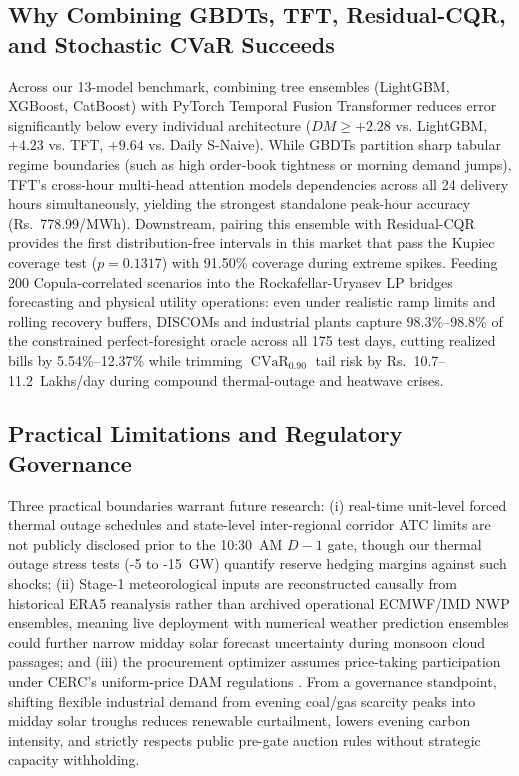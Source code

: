 \documentclass[journal,10pt,twocolumn]{IEEEtran}
\begin{document}
\subsection{Why Combining GBDTs, TFT, Residual-CQR, and Stochastic CVaR Succeeds}
Across our 13-model benchmark, combining tree ensembles (LightGBM, XGBoost, CatBoost) with PyTorch Temporal Fusion Transformer reduces error significantly below every individual architecture ($DM \ge +2.28$ vs. LightGBM, $+4.23$ vs. TFT, $+9.64$ vs. Daily S-Naive). While GBDTs partition sharp tabular regime boundaries (such as high order-book tightness or morning demand jumps), TFT's cross-hour multi-head attention models dependencies across all 24 delivery hours simultaneously, yielding the strongest standalone peak-hour accuracy (Rs.~778.99/MWh). Downstream, pairing this ensemble with Residual-CQR provides the first distribution-free intervals in this market that pass the Kupiec coverage test ($p=0.1317$) with 91.50\% coverage during extreme spikes. Feeding 200 Copula-correlated scenarios into the Rockafellar-Uryasev LP bridges forecasting and physical utility operations: even under realistic ramp limits and rolling recovery buffers, DISCOMs and industrial plants capture 98.3\%--98.8\% of the constrained perfect-foresight oracle across all 175 test days, cutting realized bills by 5.54\%--12.37\% while trimming $\operatorname{CVaR}_{0.90}$ tail risk by Rs.~10.7--11.2~Lakhs/day during compound thermal-outage and heatwave crises.

\subsection{Practical Limitations and Regulatory Governance}
Three practical boundaries warrant future research: (i) real-time unit-level forced thermal outage schedules and state-level inter-regional corridor ATC limits are not publicly disclosed prior to the 10:30~AM $D-1$ gate, though our thermal outage stress tests (-5 to -15~GW) quantify reserve hedging margins against such shocks; (ii) Stage-1 meteorological inputs are reconstructed causally from historical ERA5 reanalysis rather than archived operational ECMWF/IMD NWP ensembles, meaning live deployment with numerical weather prediction ensembles could further narrow midday solar forecast uncertainty during monsoon cloud passages; and (iii) the procurement optimizer assumes price-taking participation under CERC's uniform-price DAM regulations \cite{cerc2023order}. From a governance standpoint, shifting flexible industrial demand from evening coal/gas scarcity peaks into midday solar troughs reduces renewable curtailment, lowers evening carbon intensity, and strictly respects public pre-gate auction rules without strategic capacity withholding.
\end{document}
